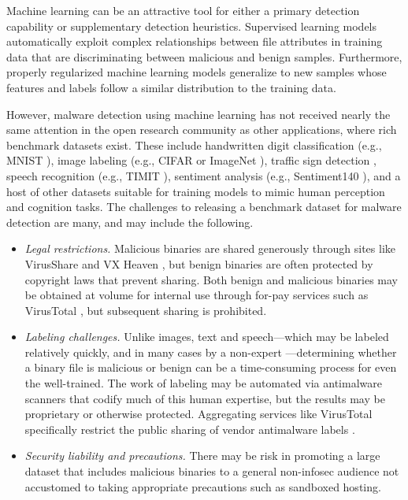 
Machine learning can be an attractive tool for either a primary detection capability or supplementary detection heuristics.  Supervised learning models automatically exploit complex relationships between file attributes in training data that are discriminating between malicious and benign samples. 
Furthermore, properly regularized machine learning models generalize to new samples whose features and labels follow a similar distribution to the training data. 

However, malware detection using machine learning has not received nearly the same attention in the open research community as other applications, where rich benchmark datasets exist.   These include handwritten digit classification (e.g., MNIST \cite{MNIST}), image labeling (e.g., CIFAR \cite{CIFAR} or ImageNet \cite{imagenet}), traffic sign detection \cite{trafficsigns}, speech recognition (e.g., TIMIT \cite{TIMIT}), sentiment analysis (e.g., Sentiment140 \cite{sentiment140}), and a host of other datasets suitable for training models to mimic human perception and cognition tasks.  The challenges to releasing a benchmark dataset for malware detection are many, and may include the following.
\begin{itemize}
\item \textit{Legal restrictions.} Malicious binaries are shared generously through sites like VirusShare \cite{virusshare} and VX Heaven \cite{vxheaven}, but benign binaries are often protected by copyright laws that prevent sharing.  Both benign and malicious binaries may be obtained at volume for internal use through for-pay services such as VirusTotal \cite{virustotal}, but subsequent sharing is prohibited.

\item \textit{Labeling challenges.}  Unlike images, text and speech---which may be labeled relatively quickly, and in many cases by a non-expert \cite{buhrmester2011amazon}---determining whether a binary file is malicious or benign can be a time-consuming process for even the well-trained.  The work of labeling may be automated via antimalware scanners that codify much of this human expertise, but the results may be proprietary or otherwise protected.  Aggregating services like VirusTotal specifically restrict the public sharing of vendor antimalware labels \cite{virustotal}.

\item \textit{Security liability and precautions.} There may be risk in promoting a large dataset that includes malicious binaries to a general non-infosec audience not accustomed to taking appropriate precautions such as sandboxed hosting.
\end{itemize}

